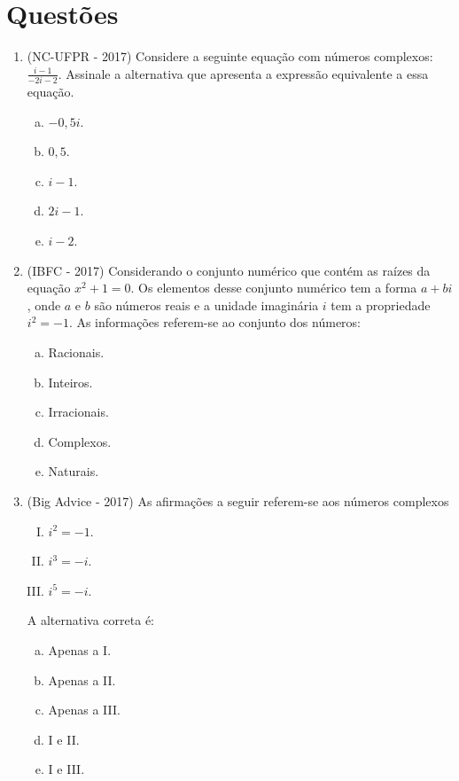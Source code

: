 \section{Questões}
 
 \begin{enumerate}
  \item (NC-UFPR - 2017) Considere a seguinte equação com números complexos: $\frac{i - 1}{-2i - 2}$. Assinale a alternativa que apresenta a expressão equivalente a essa equação. 
  \begin{enumerate}[a)]
  \item $-0,5 i$.
  \item $0,5$.
  \item $i - 1$.
  \item $2i - 1$.
  \item $i - 2$.
  \end{enumerate}
 
  \item (IBFC - 2017) Considerando o conjunto numérico que contém as raízes da equação $x^2+1=0$. Os elementos desse conjunto numérico tem a forma $a+bi$, onde $a$ e $b$ são números reais e a unidade imaginária $i$ tem a propriedade $i^2=-1$. As informações referem-se ao conjunto dos números:
  \begin{enumerate}[a)]
  \item Racionais.
  \item Inteiros.
  \item Irracionais.
  \item Complexos.
  \item Naturais.
  \end{enumerate}
  
  \item (Big Advice - 2017) As afirmações a seguir referem-se aos números complexos 
 
   \begin{enumerate}[I)]
  \item $i^2= -1$.
  \item $i^3= -i$.
  \item $i^5= -i$.
  \end{enumerate}
 A alternativa correta é:
  \begin{enumerate}[a)]
  \item Apenas a I.
  \item Apenas a II.
  \item Apenas a III.
  \item I e II.
  \item I e III.
  \end{enumerate}
  

\end{enumerate}
